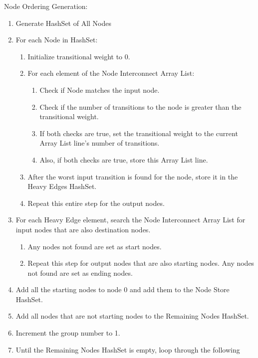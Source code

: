 \begin{description}
    \item[Node Ordering Generation:]
\end{description}
 \begin{enumerate}
   \item Generate HashSet of All Nodes
   \item For each Node in HashSet:
   \begin{enumerate}
     \item Initialize transitional weight to 0.
     \item For each element of the Node Interconnect Array List:
     \begin{enumerate}
       \item Check if Node matches the input node.
       \item Check if the number of transitions to the node is greater than the
       transitional weight.
       \item If both checks are true, set the transitional weight to the current
       Array List line's number of transitions.
       \item Also, if both checks are true, store this Array List line.
     \end{enumerate}
     \item After the worst input transition is found for the node, store it in
     the Heavy Edges HashSet.
     \item Repeat this entire step for the output nodes.
   \end{enumerate}
   \item For each Heavy Edge element, search the Node Interconnect Array List
   for input nodes that are also destination nodes.
   \begin{enumerate}
     \item Any nodes not found are set as start nodes.
     \item Repeat this step for output nodes that are also starting nodes.  Any
     nodes not found are set as ending nodes.
   \end{enumerate}
   \item Add all the starting nodes to node 0 and add them to the Node Store
   HashSet.
   \item Add all nodes that are not starting nodes to the Remaining Nodes
   HashSet.
   \item Increment the group number to 1.
   \item Until the Remaining Nodes HashSet is empty, loop through the following

\end{enumerate}
